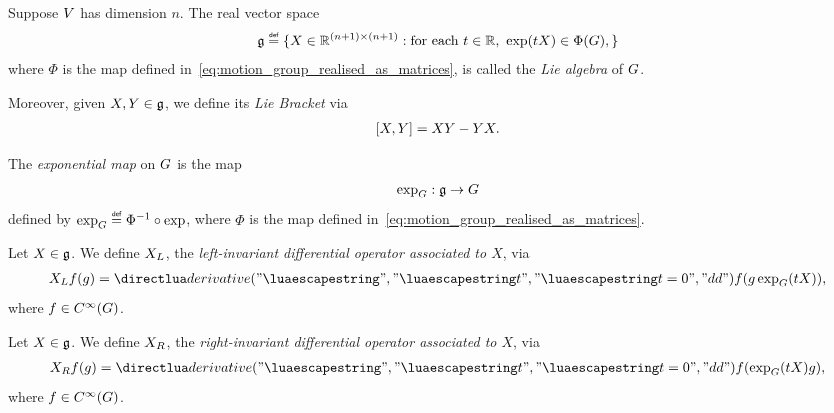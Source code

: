 \begin{definition}
\label{definition:Lie_Algebra}
    Suppose $V$ has dimension $n$.
    The real vector space
    \begin{align*}
        \LieAlgebra \defeq
            \{
                X \in \R^{(n + 1) \times (n + 1)} :
                \text{for each}\
                t \in \R,\
                \exp(t X) \in \Phi(\Group),
            \}
    \end{align*}
    where $\Phi$ is the map defined in~\eqref{eq:motion_group_realised_as_matrices},
    is called the \emph{Lie algebra} of $G$.

    Moreover, given $X, Y \in \mathfrak{g}$, we define its \emph{Lie Bracket} via
    \begin{align*}
        [X, Y] = X Y - Y X.
    \end{align*}
\end{definition}

\begin{definition}
\label{definition:exponential_map}
    The \emph{exponential map} on $G$ is the map
    \begin{align*}
        \exp_G : \mathfrak{g} \to G
    \end{align*}
    defined by $\exp_\Group \defeq \Phi^{-1} \circ \exp$,
    where $\Phi$ is the map defined in~\eqref{eq:motion_group_realised_as_matrices}.
\end{definition}

\begin{definition}
\label{definition:left-invariant_differential_operator}
    Let $X \in \mathfrak{g}$.
    We define ${X}_L$, the \emph{left-invariant differential operator associated to $X$}, via
    \begin{align*}
        \LeftDifferentialOperatorFirstOrder{X} f(g)
            = \D*{t}<t = 0> f(g \exp_\Group(t X)),
    \end{align*}
    where $f \in {C^\infty(G)}$.
\end{definition}

\begin{definition}
\label{definition:right-invariant_differential_operator}
    Let $X \in \mathfrak{g}$.
    We define ${X}_R$, the \emph{right-invariant differential operator associated to $X$}, via
    \begin{align*}
        \RightDifferentialOperatorFirstOrder{X} f(g)
            = \D*{t}<t = 0> f(\exp_\Group(t X) g),
    \end{align*}
    where $f \in {C^\infty(G)}$.
\end{definition}

